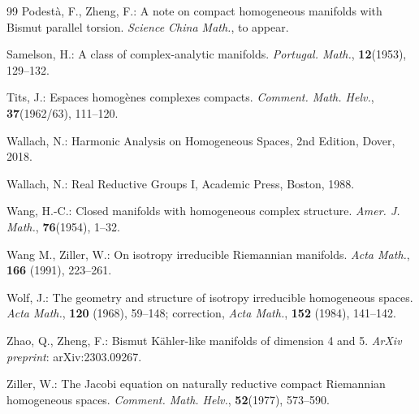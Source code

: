 \documentclass{amse-new}
\numberwithin{equation}{section} %
\begin{document}
\begin{thebibliography}{99}
  Podest\`a, F.,   Zheng, F.:   A note on compact homogeneous manifolds with Bismut parallel torsion. \emph{Science China Math.}, to appear.


Samelson, H.: A class of complex-analytic
manifolds. \emph{ Portugal. Math.}, \textbf{12}(1953), 129--132.

 Tits, J.:  Espaces homog\`{e}nes complexes compacts. \emph{
Comment. Math. Helv.}, \textbf{37}(1962/63), 111--120.


 Wallach, N.:  Harmonic Analysis on Homogeneous Spaces, 2nd Edition, Dover, 2018.

 Wallach, N.:  Real Reductive Groups I, Academic Press, Boston, 1988.

 Wang, H.-C.:  Closed manifolds with homogeneous
complex structure. \emph{ Amer. J. Math.}, \textbf{76}(1954), 1--32.

 Wang M.,  Ziller, W.: On isotropy irreducible Riemannian manifolds. \emph{
Acta Math.}, \textbf{166} (1991), 223--261.

 Wolf, J.: The geometry and structure of isotropy irreducible homogeneous
spaces.  \emph{Acta Math.}, \textbf{120} (1968), 59--148; correction, \emph{Acta Math.}, \textbf{152} (1984),
141--142.

 Zhao, Q.,  Zheng, F.: Bismut K\"ahler-like manifolds of dimension 4 and 5.  \emph{ArXiv preprint}: arXiv:2303.09267.

 Ziller, W.: The Jacobi equation on naturally reductive compact Riemannian homogeneous spaces. \emph{ Comment. Math. Helv.}, \textbf{52}(1977), 573--590.
\end{thebibliography}
\end{document}
